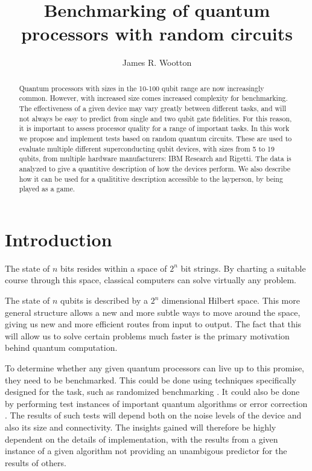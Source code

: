 \documentclass[aps,prl,twocolumn,showpacs,preprintnumbers]{revtex4-1}
\begin{document}
\title{Benchmarking of quantum processors with random circuits}
\author{James R. Wootton}


\begin{abstract}

Quantum processors with sizes in the 10-100 qubit range are now increasingly common. However, with increased size comes increased complexity for benchmarking. The effectiveness of a given device may vary greatly between different tasks, and will not always be  easy to predict from single and two qubit gate fidelities. For this reason, it is important to assess processor quality for a range of important tasks. In this work we propose and implement tests based on random quantum circuits. These are used to evaluate multiple different superconducting qubit devices, with sizes from 5 to 19 qubits, from multiple hardware manufacturers: IBM Research and Rigetti. The data is analyzed to give a quantitive description of how the devices perform.  We also describe how it can be used for a qualititive description accessible to the layperson, by being played as a game.


\end{abstract}


\pacs{}

\maketitle


\section{Introduction}

The state of $n$ bits resides within a space of $2^n$ bit strings. By charting a suitable course through this space, classical computers can solve virtually any problem.

The state of $n$ qubits is described by a $2^n$ dimensional Hilbert space. This more general structure allows a new and more subtle ways to move around the space, giving us new and more efficient routes from input to output. The fact that this will allow us to solve certain problems much faster is the primary motivation behind quantum computation.

To determine whether any given quantum processors can live up to this promise, they need to be benchmarked. This could be done using techniques specifically designed for the task, such as randomized benchmarking \cite{}. It could also be done by performing test instances of important quantum algorithms \cite{} or error correction \cite{}. The results of such tests will depend both on the noise levels of the device and also its size and connectivity. The insights gained will therefore be highly dependent on the details of implementation, with the results from a given instance of a given algorithm not providing an unambigous predictor for the results of others.
\end{document}
